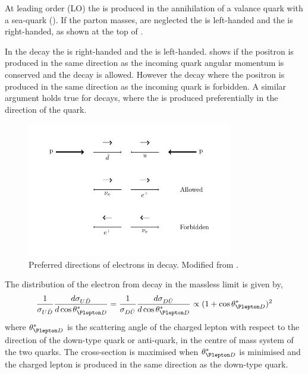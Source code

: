 At leading order (LO) the \PWp is produced in the annihilation of a \Pup valance quark
with a \APdown sea-quark (). 
If the parton masses, are neglected the \Pup is left-handed and the \APdown is
right-handed, as shown at the top of . 

In the \PWp decay the \Ppositron is right-handed and the \Pnue is left-handed.
 shows if the  positron is produced in the same direction
as the incoming \APdown quark angular momentum is conserved and the decay is
allowed.
However the decay where the positron is produced in the same direction as the
incoming \Pup quark is forbidden.
A similar argument holds true for \PWm decays, where the \Pelectron is produced
preferentially in the direction of the \Pdown quark.

\begin{figure}[htbp]
  \centering
  \includegraphics[width=0.8\textwidth]{w_decay_directions}
  \caption{Preferred directions of electrons in 
    \HepProcess{\PWplus\to\APelectron\Pnue} decay. Modified from \cite{aitchison2004gauge}. }
  \label{wbos:wspin}
\end{figure}

The distribution of the electron from \PWpm decay in the massless limit
is given by\cite{perkins2000introduction,aitchison2004gauge},
\begin{equation}
  \frac{1}{\sigma_{U\bar{D}}}
  \frac{d \sigma_{U\bar{D}}}{d \cos \theta_{\Plepton D}^{\ast}}
  =
  \frac{1}{\sigma_{D\bar{U}}}
  \frac{d \sigma_{D\bar{U}}}{d \cos \theta_{\Plepton D}^{\ast}}
  \propto
  (1+\cos \theta_{\Plepton D}^{\ast})^2
  \label{wbos:lepton}
\end{equation}
where $\theta_{\Plepton D}^{\ast}$ is the scattering angle of the charged
lepton with respect to the direction of the down-type quark or anti-quark, in
the centre of mass system of the two quarks. The cross-section is maximised when
$\theta_{\Plepton D}^{\ast}$ is minimised and the charged lepton is produced in
the same direction as the down-type quark.

